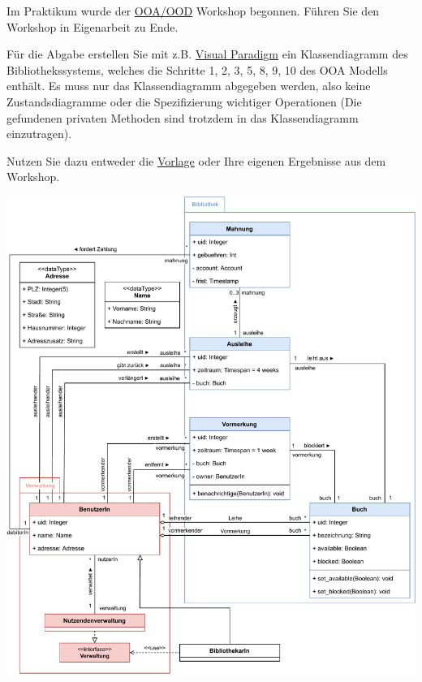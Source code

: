 \documentclass{abgabe}
\begin{document}
\begin{questions}

    Im Praktikum wurde der \href{https://www.ili.fh-aachen.de/goto.php?target=file_851203}{OOA/OOD} Workshop begonnen. Führen Sie den Workshop in Eigenarbeit zu Ende.

    Für die Abgabe erstellen Sie mit z.B. \href{https://www.ili.fh-aachen.de/ilias.php?baseClass=ilLinkResourceHandlerGUI&ref_id=341847&cmd=calldirectlink}{Visual Paradigm} ein Klassendiagramm des Bibliothekssystems, welches die Schritte 1, 2, 3, 5, 8, 9, 10 des OOA Modells enthält.
    Es muss nur das Klassendiagramm abgegeben werden, also keine Zustandsdiagramme oder die Spezifizierung wichtiger Operationen (Die gefundenen privaten Methoden sind trotzdem in das Klassendiagramm einzutragen).

    Nutzen Sie dazu entweder die \href{https://www.ili.fh-aachen.de/goto.php?target=file_858433}{Vorlage} oder Ihre eigenen Ergebnisse aus dem Workshop.

    \clearpage
    \begin{solution}
        \begin{center}
            \includegraphics[width=\textwidth]{swt_h06_bibliothek.pdf}
        \end{center}
    \end{solution}
\end{questions}
\end{document}
